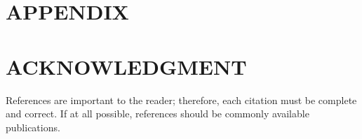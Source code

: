\documentclass[a4paper, 10pt, conference]{ieeeconf}      %
\begin{document}






\section*{APPENDIX}



\section*{ACKNOWLEDGMENT}


References are important to the reader; therefore, each citation must be complete and correct. If at all possible, references should be commonly available publications.



\begin{thebibliography}{99}
\end{thebibliography}
\end{document}
